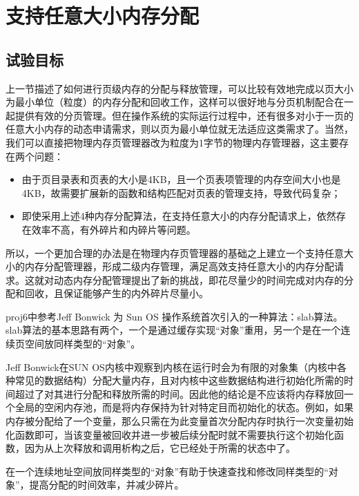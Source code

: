 \section{支持任意大小内存分配}\label{ux652fux6301ux4efbux610fux5927ux5c0fux5185ux5b58ux5206ux914d}

\subsection{试验目标}\label{ux8bd5ux9a8cux76eeux6807}

上一节描述了如何进行页级内存的分配与释放管理，可以比较有效地完成以页大小为最小单位（粒度）的内存分配和回收工作，这样可以很好地与分页机制配合在一起提供有效的分页管理。但在操作系统的实际运行过程中，还有很多对小于一页的任意大小内存的动态申请需求，则以页为最小单位就无法适应这类需求了。当然，我们可以直接把物理内存页管理器改为粒度为1字节的物理内存管理器，这主要存在两个问题：

\begin{itemize}
\tightlist
\item
  由于页目录表和页表的大小是4KB，且一个页表项管理的内存空间大小也是4KB，故需要扩展新的函数和结构匹配对页表的管理支持，导致代码复杂；
\item
  即使采用上述4种内存分配算法，在支持任意大小的内存分配请求上，依然存在效率不高，有外碎片和内碎片等问题。
\end{itemize}

所以，一个更加合理的办法是在物理内存页管理器的基础之上建立一个支持任意大小的内存分配管理器，形成二级内存管理，满足高效支持任意大小的内存分配请求。这就对动态内存分配管理提出了新的挑战，即花尽量少的时间完成对内存的分配和回收，且保证能够产生的内外碎片尽量小。

proj6中参考Jeff Bonwick 为 Sun OS
操作系统首次引入的一种算法：slab算法。slab算法的基本思路有两个，一个是通过缓存实现``对象''重用，另一个是在一个连续页空间放同样类型的``对象''。

Jeff Bonwick在SUN
OS内核中观察到内核在运行时会为有限的对象集（内核中各种常见的数据结构）分配大量内存，且对内核中这些数据结构进行初始化所需的时间超过了对其进行分配和释放所需的时间。因此他的结论是不应该将内存释放回一个全局的空闲内存池，而是将内存保持为针对特定目而初始化的状态。例如，如果内存被分配给了一个变量，那么只需在为此变量首次分配内存时执行一次变量初始化函数即可，当该变量被回收并进一步被后续分配时就不需要执行这个初始化函数，因为从上次释放和调用析构之后，它已经处于所需的状态中了。

在一个连续地址空间放同样类型的``对象''有助于快速查找和修改同样类型的``对象''，提高分配的时间效率，并减少碎片。

